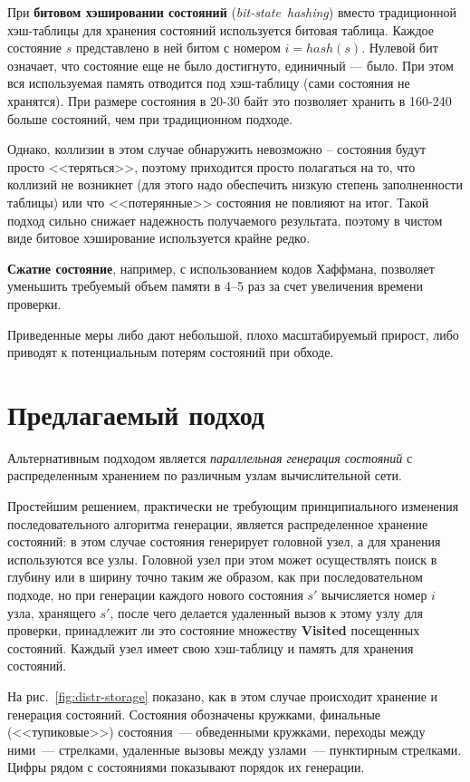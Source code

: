 \documentclass[12pt,a4paper,fleqn]{article}
\newcommand{\Code}[1]{\textbf{\mbox{#1}}}
\newcommand{\Term}[1]{\emph{\mbox{#1}}}
\begin{document}
При \textbf{битовом хэшировании состояний} (\Term{bit-state hashing}) вместо традиционной
хэш-таблицы для хранения состояний используется битовая таблица. Каждое состояние $s$
представлено в ней битом с номером $i = hash(s)$. Нулевой бит означает, что состояние еще
не было достигнуто, единичный — было. При этом вся используемая память отводится под
хэш-таблицу (сами состояния не хранятся). При размере состояния в 20-30 байт это позволяет
хранить в 160-240 больше состояний, чем при традиционном подходе.

Однако, коллизии в этом случае обнаружить невозможно -- состояния будут просто <<теряться>>,
поэтому приходится просто полагаться на то, что коллизий не возникнет (для этого надо обеспечить
низкую степень заполненности таблицы) или что <<потерянные>> состояния не повлияют на итог. Такой
подход сильно снижает надежность получаемого результата, поэтому в чистом виде битовое хэширование
используется крайне редко.

\textbf{Сжатие состояние}, например, с использованием кодов Хаффмана, позволяет уменьшить требуемый
объем памяти в 4--5 раз за счет увеличения времени проверки.

Приведенные меры либо дают небольшой, плохо масштабируемый прирост, либо приводят к потенциальным потерям
состояний при обходе.

\section{Предлагаемый подход}

Альтернативным подходом является \emph{параллельная генерация состояний} с распределенным хранением
по различным узлам вычислительной сети.

Простейшим решением, практически не требующим принципиального изменения последовательного
алгоритма генерации, является распределенное хранение состояний: в этом случае состояния
генерирует головной узел, а для хранения используются все узлы. Головной узел при этом
может осуществлять поиск в глубину или в ширину точно таким же образом, как при
последовательном подходе, но при генерации каждого нового состояния $s'$ вычисляется номер
$i$ узла, хранящего $s'$, после чего делается удаленный вызов к этому узлу для проверки,
принадлежит ли это состояние множеству \Code{Visited} посещенных состояний. Каждый узел
имеет свою хэш-таблицу и память для хранения состояний.

На рис.~\ref{fig:distr-storage} показано, как в этом случае происходит хранение и
генерация состояний. Состояния обозначены кружками, финальные (<<тупиковые>>) состояния~---
обведенными кружками, переходы между ними~--- стрелками, удаленные вызовы между узлами~---
пунктирным стрелками. Цифры рядом с состояниями показывают порядок их генерации.
\end{document}
